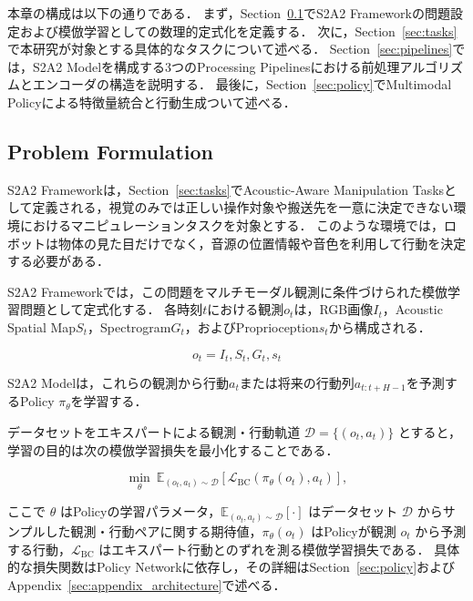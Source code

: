 \documentclass{article}
\begin{document}
	本章の構成は以下の通りである．
	まず，Section~\ref{sec:problem}でS2A2 Frameworkの問題設定および模倣学習としての数理的定式化を定義する．
	次に，Section~\ref{sec:tasks}で本研究が対象とする具体的なタスクについて述べる．
	Section~\ref{sec:pipelines}では，S2A2 Modelを構成する3つのProcessing Pipelinesにおける前処理アルゴリズムとエンコーダの構造を説明する．
	最後に，Section~\ref{sec:policy}でMultimodal Policyによる特徴量統合と行動生成ついて述べる．




\subsection{Problem Formulation}
\label{sec:problem}
	S2A2 Frameworkは，Section~\ref{sec:tasks}でAcoustic-Aware Manipulation Tasksとして定義される，視覚のみでは正しい操作対象や搬送先を一意に決定できない環境におけるマニピュレーションタスクを対象とする．
	このような環境では，ロボットは物体の見た目だけでなく，音源の位置情報や音色を利用して行動を決定する必要がある．

	S2A2 Frameworkでは，この問題をマルチモーダル観測に条件づけられた模倣学習問題として定式化する．
	各時刻$t$における観測$o_t$は，RGB画像$I_t$，Acoustic Spatial Map$S_t$，Spectrogram$G_t$，およびProprioception$s_t$から構成される．

	\begin{equation}
	o_t = {I_t, S_t, G_t, s_t}
	\end{equation}

	S2A2 Modelは，これらの観測から行動$a_t$または将来の行動列$a_{t:t+H-1}$を予測するPolicy $\pi_\theta$を学習する．

	データセットをエキスパートによる観測・行動軌道 $\mathcal{D}=\{(o_t,a_t)\}$ とすると，学習の目的は次の模倣学習損失を最小化することである．

	\begin{equation}
	\min_{\theta}\ \mathbb{E}_{(o_t,a_t)\sim\mathcal{D}}
	\left[\mathcal{L}_{\mathrm{BC}}\left(\pi_\theta(o_t),a_t\right)\right],
	\end{equation}

	ここで $\theta$ はPolicyの学習パラメータ，$\mathbb{E}_{(o_t,a_t)\sim\mathcal{D}}[\cdot]$ はデータセット $\mathcal{D}$ からサンプルした観測・行動ペアに関する期待値，$\pi_\theta(o_t)$ はPolicyが観測 $o_t$ から予測する行動，$\mathcal{L}_{\mathrm{BC}}$ はエキスパート行動とのずれを測る模倣学習損失である．
	具体的な損失関数はPolicy Networkに依存し，その詳細はSection~\ref{sec:policy}およびAppendix~\ref{sec:appendix_architecture}で述べる．
\end{document}
